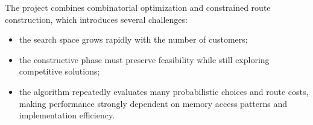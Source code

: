 The project combines combinatorial optimization and constrained route construction, which introduces several challenges:
\begin{itemize}
    \item the search space grows rapidly with the number of customers;
    \item the constructive phase must preserve feasibility while still exploring competitive solutions;
    \item the algorithm repeatedly evaluates many probabilistic choices and route costs, making performance strongly dependent on memory access patterns and implementation efficiency.
\end{itemize}
